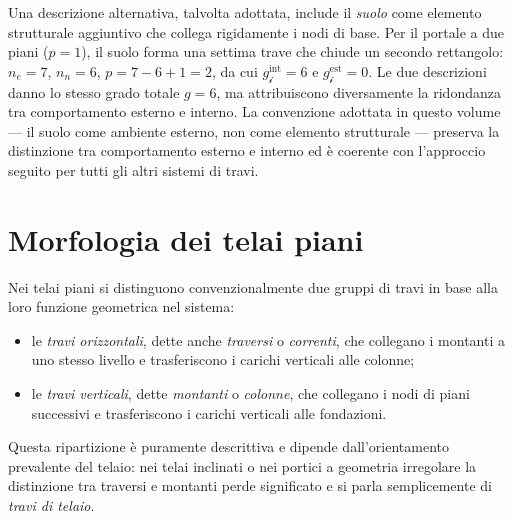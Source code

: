 \begin{oss}
	Una descrizione alternativa, talvolta adottata,
	include il \emph{suolo} come elemento strutturale
	aggiuntivo che collega rigidamente i nodi di base.
	Per il portale a due piani ($p=1$), il suolo
	forma una settima trave che chiude un secondo
	rettangolo: $n_e = 7$, $n_n = 6$,
	$p = 7-6+1 = 2$, da cui
	$g_{\mathscr{i}}^{\text{int}} = 6$ e
	$g_{\mathscr{i}}^{\text{est}} = 0$.
	Le due descrizioni danno lo stesso grado totale
	$g = 6$, ma attribuiscono diversamente la
	ridondanza tra comportamento esterno e interno.
	La convenzione adottata in questo volume ---
	il suolo come ambiente esterno, non come elemento
	strutturale --- preserva la distinzione tra
	comportamento esterno e interno ed è coerente
	con l'approccio seguito per tutti gli altri
	sistemi di travi.
\end{oss}



\section{Morfologia dei telai piani}
\label{sec:telai_morfologia}

Nei telai piani si distinguono convenzionalmente
due gruppi di travi in base alla loro funzione
geometrica nel sistema:

\begin{itemize}
	\item le \emph{travi orizzontali}, dette anche
	\emph{traversi} o \emph{correnti}, che collegano
	i montanti a uno stesso livello e trasferiscono
	i carichi verticali alle colonne;
	
	\item le \emph{travi verticali}, dette
	\emph{montanti} o \emph{colonne}, che collegano
	i nodi di piani successivi e trasferiscono
	i carichi verticali alle fondazioni.
\end{itemize}

Questa ripartizione è puramente descrittiva e
dipende dall'orientamento prevalente del telaio:
nei telai inclinati o nei portici a geometria
irregolare la distinzione tra traversi e montanti
perde significato e si parla semplicemente di
\emph{travi di telaio}.

